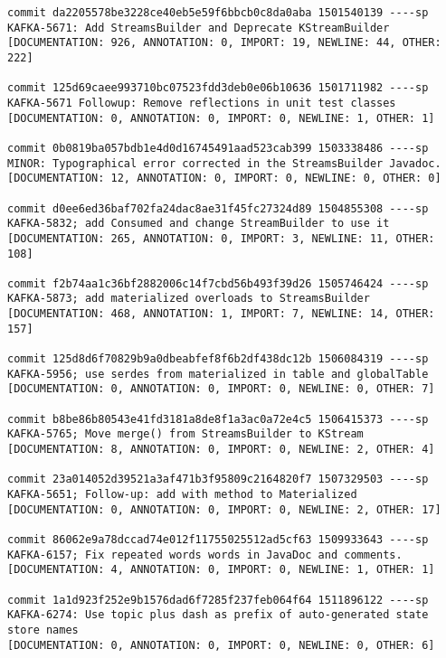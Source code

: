 \begin{lstlisting}
commit da2205578be3228ce40eb5e59f6bbcb0c8da0aba 1501540139 ----sp
KAFKA-5671: Add StreamsBuilder and Deprecate KStreamBuilder                                         
[DOCUMENTATION: 926, ANNOTATION: 0, IMPORT: 19, NEWLINE: 44, OTHER: 222]

commit 125d69caee993710bc07523fdd3deb0e06b10636 1501711982 ----sp
KAFKA-5671 Followup: Remove reflections in unit test classes                                        
[DOCUMENTATION: 0, ANNOTATION: 0, IMPORT: 0, NEWLINE: 1, OTHER: 1]

commit 0b0819ba057bdb1e4d0d16745491aad523cab399 1503338486 ----sp
MINOR: Typographical error corrected in the StreamsBuilder Javadoc.                                 
[DOCUMENTATION: 12, ANNOTATION: 0, IMPORT: 0, NEWLINE: 0, OTHER: 0]

commit d0ee6ed36baf702fa24dac8ae31f45fc27324d89 1504855308 ----sp
KAFKA-5832; add Consumed and change StreamBuilder to use it                                         
[DOCUMENTATION: 265, ANNOTATION: 0, IMPORT: 3, NEWLINE: 11, OTHER: 108]

commit f2b74aa1c36bf2882006c14f7cbd56b493f39d26 1505746424 ----sp
KAFKA-5873; add materialized overloads to StreamsBuilder                                            
[DOCUMENTATION: 468, ANNOTATION: 1, IMPORT: 7, NEWLINE: 14, OTHER: 157]

commit 125d8d6f70829b9a0dbeabfef8f6b2df438dc12b 1506084319 ----sp
KAFKA-5956; use serdes from materialized in table and globalTable                                   
[DOCUMENTATION: 0, ANNOTATION: 0, IMPORT: 0, NEWLINE: 0, OTHER: 7]

commit b8be86b80543e41fd3181a8de8f1a3ac0a72e4c5 1506415373 ----sp
KAFKA-5765; Move merge() from StreamsBuilder to KStream                                             
[DOCUMENTATION: 8, ANNOTATION: 0, IMPORT: 0, NEWLINE: 2, OTHER: 4]

commit 23a014052d39521a3af471b3f95809c2164820f7 1507329503 ----sp
KAFKA-5651; Follow-up: add with method to Materialized                                              
[DOCUMENTATION: 0, ANNOTATION: 0, IMPORT: 0, NEWLINE: 2, OTHER: 17]

commit 86062e9a78dccad74e012f11755025512ad5cf63 1509933643 ----sp
KAFKA-6157; Fix repeated words words in JavaDoc and comments.                                       
[DOCUMENTATION: 4, ANNOTATION: 0, IMPORT: 0, NEWLINE: 1, OTHER: 1]

commit 1a1d923f252e9b1576dad6f7285f237feb064f64 1511896122 ----sp
KAFKA-6274: Use topic plus dash as prefix of auto-generated state store names                       
[DOCUMENTATION: 0, ANNOTATION: 0, IMPORT: 0, NEWLINE: 0, OTHER: 6]


\end{lstlisting}
